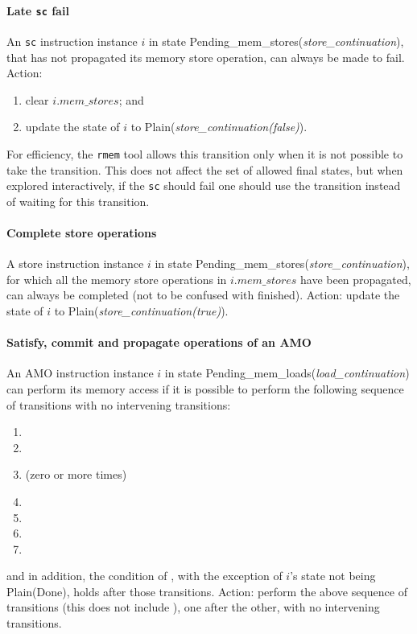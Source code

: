 \paragraph{Late {\tt sc} fail}\label{omm:late_sc_fail}
An {\tt sc} instruction instance $i$ in state {\sc Pending\_mem\_stores}({\it store\_continuation}), that has not propagated its memory store operation, can always be made to fail.
Action:
\begin{enumerate}
\item clear $i.\textit{mem\_stores}$; and
\item update the state of $i$ to {\sc Plain}({\it store\_continuation(false)}).
\end{enumerate}

\begin{commentary}
For efficiency, the {\tt rmem} tool allows this transition only when it is not possible to take the  transition.
This does not affect the set of allowed final states, but when explored interactively, if the {\tt sc} should fail one should use the  transition instead of waiting for this transition.
\end{commentary}

\paragraph{Complete store operations}\label{omm:complete_stores}
A store instruction instance $i$ in state {\sc Pending\_mem\_stores}({\it store\_continuation}), for which all the memory store operations in $i.\textit{mem\_stores}$ have been propagated, can always be completed (not to be confused with finished).
Action: update the state of $i$ to {\sc Plain}({\it store\_continuation(true)}).


\paragraph{Satisfy, commit and propagate operations of an AMO}\label{omm:do_amo}
An AMO instruction instance $i$ in state {\sc Pending\_mem\_loads}({\it load\_continuation}) can perform its memory access if it is possible to perform the following sequence of transitions with no intervening transitions:
\begin{enumerate}
\item {}
\item {}
\item {} (zero or more times)
\item {}
\item {}
\item {}
\item {}
\end{enumerate}
and in addition, the condition of , with the exception of $i$'s state not being {\sc Plain}({\sc Done}), holds after those transitions.
Action: perform the above sequence of transitions (this does not include ), one after the other, with no intervening transitions.

